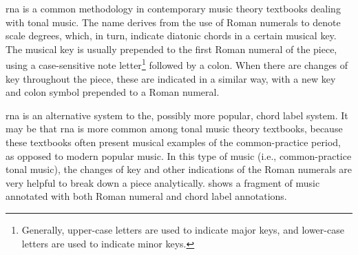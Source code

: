 

\gls{rna} is a common methodology in contemporary music
theory textbooks dealing with tonal music. The name derives
from the use of Roman numerals to denote scale degrees,
which, in turn, indicate diatonic chords in a certain
musical key. The musical key is usually prepended to the
first Roman numeral of the piece, using a case-sensitive
note letter\footnote{Generally, upper-case letters are used
to indicate major keys, and lower-case letters are used to
indicate minor keys.} followed by a colon. When there are
changes of key throughout the piece, these are indicated in
a similar way, with a new key and colon symbol prepended to
a Roman numeral.

\gls{rna} is an alternative system to the, possibly more
popular, chord label system. It may be that \gls{rna} is
more common among tonal music theory textbooks, because
these textbooks often present musical examples of the
common-practice period, as opposed to modern popular music.
In this type of music (i.e., common-practice tonal music),
the changes of key and other indications of the Roman
numerals are very helpful to break down a piece
analytically.  shows a fragment of music
annotated with both Roman numeral and chord label
annotations.

